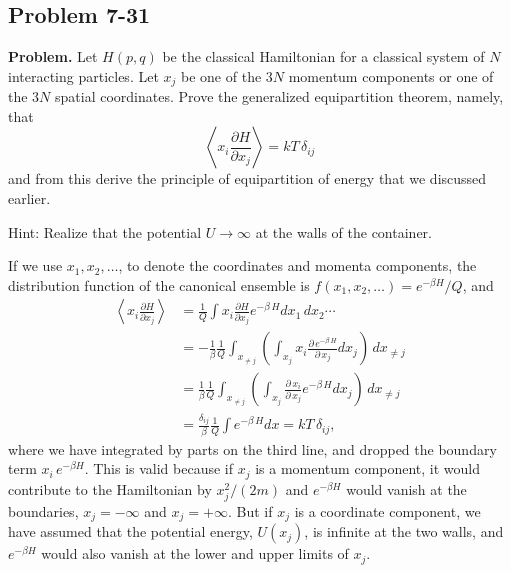 \documentclass[twocolumn, 10pt]{article}
\numberwithin{equation}{section}
\newenvironment{problem}
{\par\medskip \color{problemblue}
  \textbf{Problem. }\ignorespaces}
{\medskip}
\newenvironment{solution}[1][\empty]
{\par\medskip\sffamily
  \textbf{\ifx\empty#1{Solution.}\relax\else{#1}\fi} \ignorespaces}
{\medskip}
\begin{document}
\subsection{Problem 7-31}

\begin{problem}
  Let $H(p, q)$ be the classical Hamiltonian
  for a classical system of $N$ interacting particles.
  Let $x_j$ be one of the $3N$ momentum components
  or one of the $3N$ spatial coordinates.
  Prove the generalized equipartition theorem, namely, that
  $$
  \left\langle
    x_i \frac{ \partial H } { \partial x_j }
  \right\rangle
  = kT \, \delta_{ij}
  $$
  and from this derive the principle
  of equipartition of energy that we discussed earlier.

  Hint: Realize that the potential $U \to \infty$
  at the walls of the container.
\end{problem}

\begin{solution}
If we use $x_1, x_2, \dots$, to denote
the coordinates and momenta components,
the distribution function of the canonical ensemble
is $f(x_1, x_2, \dots) = e^{-\beta H}/Q$, and
%
\begin{align*}
  \left\langle
    x_i \frac{ \partial H } { \partial x_j }
  \right\rangle
  &=
  \frac{1}{Q} \int
    x_i \frac{ \partial H } { \partial x_j }
    e^{-\beta \, H}
    d x_1 \, d x_2 \cdots
  \\
  &=
  -
  \frac{1}{\beta}
  \frac{1}{Q}
  \int_{x_{\ne j}}
    \left(
      \int_{x_j}
      x_i \frac{ \partial \, e^{-\beta \, H} } { \partial \, x_j }
      d x_j
    \right) \, d x_{\ne j}
  \\
  &=
  \frac{1}{\beta}
  \frac{1}{Q}
  \int_{x_{\ne j}}
    \left(
      \int_{x_j}
      \frac{ \partial \, x_i } { \partial \, x_j }
      e^{-\beta \, H}
      d x_j
    \right)
  \, d x_{\ne j}
  \\
  &=
  \frac{\delta_{ij}}{\beta}
  \frac{1}{Q}
  \int e^{-\beta \, H} d x
  = kT \, \delta_{ij}
  ,
\end{align*}
%
where we have integrated by parts on the third line,
and dropped the boundary term $x_i \, e^{-\beta H}$.
This is valid because if $x_j$ is a momentum component,
it would contribute to the Hamiltonian by $x_j^2/(2m)$
and $e^{-\beta H}$ would vanish at the boundaries,
$x_j = -\infty$ and $x_j = +\infty$.
%
But if $x_j$ is a coordinate component,
we have assumed that the potential energy, $U(x_j)$,
is infinite at the two walls,
and $e^{-\beta H}$ would also vanish
at the lower and upper limits of $x_j$.
\end{solution}
\end{document}
